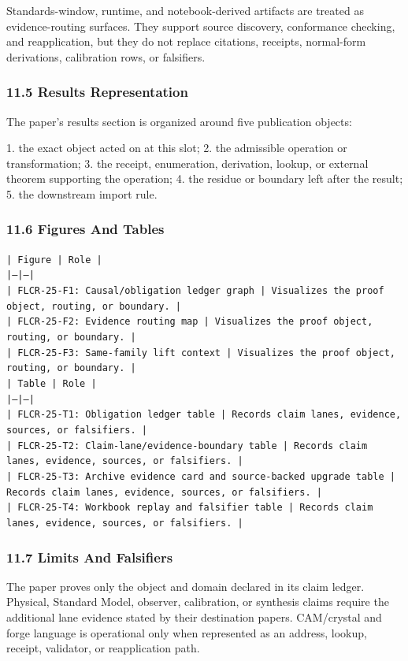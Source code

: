 \documentclass[11pt]{article}
\begin{document}
Standards-window, runtime, and notebook-derived artifacts are treated
as evidence-routing surfaces. They support source discovery, conformance
checking, and reapplication, but they do not replace citations, receipts,
normal-form derivations, calibration rows, or falsifiers.

\subsubsection*{11.5 Results Representation}

The paper's results section is organized around five publication objects:

1. the exact object acted on at this slot;
2. the admissible operation or transformation;
3. the receipt, enumeration, derivation, lookup, or external theorem supporting
   the operation;
4. the residue or boundary left after the result;
5. the downstream import rule.

\subsubsection*{11.6 Figures And Tables}

\noindent\texttt{| Figure | Role |}\\
\noindent\texttt{|---|---|}\\
\noindent\texttt{| FLCR-25-F1: Causal/obligation ledger graph | Visualizes the proof object, routing, or boundary. |}\\
\noindent\texttt{| FLCR-25-F2: Evidence routing map | Visualizes the proof object, routing, or boundary. |}\\
\noindent\texttt{| FLCR-25-F3: Same-family lift context | Visualizes the proof object, routing, or boundary. |}\\

\noindent\texttt{| Table | Role |}\\
\noindent\texttt{|---|---|}\\
\noindent\texttt{| FLCR-25-T1: Obligation ledger table | Records claim lanes, evidence, sources, or falsifiers. |}\\
\noindent\texttt{| FLCR-25-T2: Claim-lane/evidence-boundary table | Records claim lanes, evidence, sources, or falsifiers. |}\\
\noindent\texttt{| FLCR-25-T3: Archive evidence card and source-backed upgrade table | Records claim lanes, evidence, sources, or falsifiers. |}\\
\noindent\texttt{| FLCR-25-T4: Workbook replay and falsifier table | Records claim lanes, evidence, sources, or falsifiers. |}\\

\subsubsection*{11.7 Limits And Falsifiers}

The paper proves only the object and domain declared in its claim ledger.
Physical, Standard Model, observer, calibration, or synthesis claims require
the additional lane evidence stated by their destination papers. CAM/crystal
and forge language is operational only when represented as an address, lookup,
receipt, validator, or reapplication path.
\end{document}
